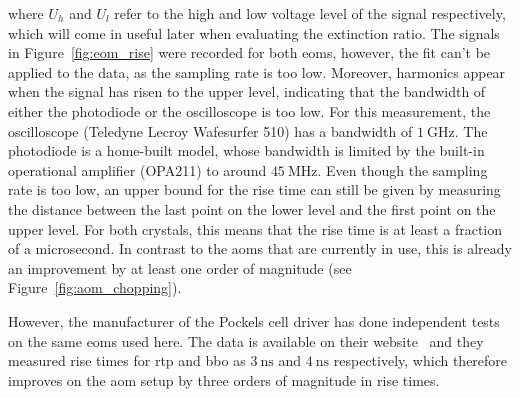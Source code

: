 where $U_h$ and $U_l$ refer to the high and low voltage level of the signal respectively, which will come in useful later when evaluating the extinction ratio. The signals in Figure~\ref{fig:eom_rise} were recorded for both \acp{eom}, however, the fit can't be applied to the data, as the sampling rate is too low.
Moreover, harmonics appear when the signal has risen to the upper level, indicating that the bandwidth of either the photodiode or the oscilloscope is too low. For this measurement, the oscilloscope (Teledyne Lecroy Wafesurfer 510) has a bandwidth of $\SI{1}{\giga\hertz}$.%
 The photodiode is a home-built model, whose bandwidth is limited by the built-in operational amplifier (OPA211) to around $\SI{45}{\mega\hertz}$. Even though the sampling rate is too low, an upper bound for the rise time can still be given by measuring the distance between the last point on the lower level and the first point on the upper level. For both crystals, this means that the rise time is at least a fraction of a microsecond. In contrast to the \acp{aom} that are currently in use, this is already an improvement by at least one order of magnitude (see Figure~\ref{fig:aom_chopping}).

However, the manufacturer of the Pockels cell driver has done independent tests on the same \acp{eom} used here. The data is available on their website~\cite{Bergmann2020} and they measured rise times for \ac{rtp} and \ac{bbo} as $\SI{3}{\nano\second}$ and $\SI{4}{\nano\second}$ respectively, which therefore improves on the \ac{aom} setup by three orders of magnitude in rise times.

\begin{figure}[tbp]%
\end{figure}

